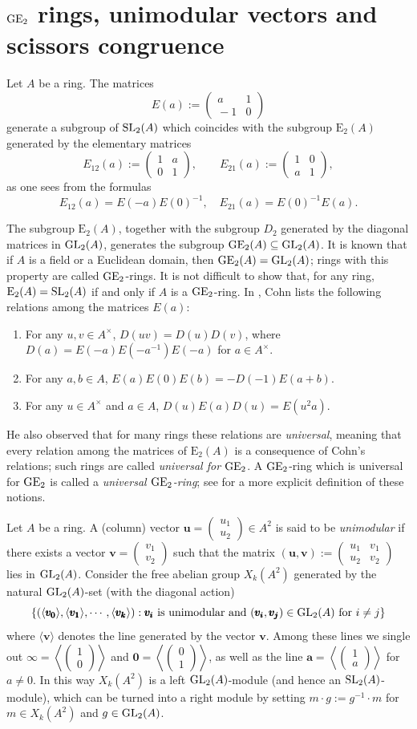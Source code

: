 \documentclass[11pt]{amsart}
\theoremstyle{definition}
\theoremstyle{plain}
\numberwithin{equation}{section}
\renewcommand{\aa}{{A^\times}}
\newcommand{\lan}{\langle}
\newcommand{\ran}{\rangle}
\newcommand{\GE}{{\rm GE}}
\newcommand{\Ee}{\mathrm{E}}
\newcommand{\GL}{\mathit{{\rm GL}}}
\newcommand{\SL}{\mathit{{\rm SL}}}
\newcommand {\mtx}[2]
{\left(\!\!\!
\begin{array}{cc}
#1 \\
#2 
\end{array}
\!\!\!\right)}
\newcommand{\mtxx}[4]
{\left(\!\!
\begin{array}{cc}
\!\!#1 & \!\!#2\\
\!\!#3 & \!\!#4
\end{array}\!\!
\right)}
\begin{document}
\section{\texorpdfstring{$\GE_2$}{GE2} rings, unimodular vectors and scissors congruence}
Let $A$ be a ring. The matrices
\[
    E(a):=\mtxx{a}{1}{-1}{0}
\]
generate a subgroup of $\SL_2(A)$ which coincides with the subgroup $\Ee_2(A)$ generated by the elementary matrices
\[
    E_{12}(a):=\mtxx{1}{a}{0}{1},\quad \quad E_{21}(a):=\mtxx{1}{0}{a}{1}, 
\]
as one sees from the formulas
\[
    E_{12}(a)=E(-a)E(0)^{-1}, \quad E_{21}(a)=E(0)^{-1}E(a).
\]

The subgroup $\Ee_2(A)$, together with the subgroup $D_2$ generated by the diagonal matrices in $\GL_2(A)$, generates the subgroup $\GE_2(A)\subseteq \GL_2(A)$. It is known that if $A$ is a field or a Euclidean domain, then $\GE_2(A)=\GL_2(A)$; rings with this property are called $\GE_2$-rings. It is not difficult to show that, for any ring, $\Ee_2(A)=\SL_2(A)$ if and only if $A$ is a $\GE_2$-ring. In \cite{cohn1966}, Cohn lists the following relations among the matrices $E(a)$:
\begin{enumerate}
    \item For any $u,v\in\aa$, $D(uv)=D(u)D(v)$, where $D(a)=E(-a)E(-a^{-1})E(-a)$ for $a\in\aa$.
    \item For any $a,b\in A$, $E(a)E(0)E(b)=-D(-1)E(a+b)$.
    \item For any $u\in\aa$ and $a\in A$, $D(u)E(a)D(u)=E(u^2a)$.
\end{enumerate}

He also observed that for many rings these relations are {\it universal}, meaning that every relation among the matrices of $\Ee_2(A)$ is a consequence of Cohn's relations; such rings are called {\it universal for $\GE_2$}. A $\GE_2$-ring which is universal for $\GE_2$ is called a {\it universal $\GE_2$-ring}; see \cite[\S 4]{hutchinson2022} for a more explicit definition of these notions.

Let $A$ be a ring. A (column) vector $\pmb{u}=\mtx{u_1}{u_2}\in A^2$ is said to be \textit{unimodular} if there exists a vector $\pmb{v}=\mtx{v_1}{v_2}$ such that the matrix $(\pmb{u},\pmb{v}):=\mtxx{u_1}{v_1}{u_2}{v_2}$ lies in $\GL_2(A)$. Consider the free abelian group $X_k(A^2)$ generated by the natural $\GL_2(A)$-set (with the diagonal action)
\[
\{(\lan\pmb{v_0}\ran,\lan\pmb{v_1}\ran,\cdots,\lan\pmb{v_k}\ran): \pmb{v_i} \text{ is unimodular and } (\pmb{v_i},\pmb{v_j})\in \GL_2(A) \text{ for } i\neq j\}
\]
where $\lan \pmb{v}\ran$ denotes the line generated by the vector $\pmb{v}$. Among these lines we single out $\pmb{\infty}=\left\lan\mtx{1}{0}\right\ran$ and $\pmb{0}=\left\lan\mtx{0}{1}\right\ran$, as well as the line $\pmb{a}=\left\lan\mtx{1}{a}\right\ran$ for $a\neq 0$. In this way $X_k(A^2)$ is a left $\GL_2(A)$-module (and hence an $\SL_2(A)$-module), which can be turned into a right module by setting $m\cdot g:=g^{-1}\cdot m$ for $m\in X_k(A^2)$ and $g\in\GL_2(A)$.
\end{document}
